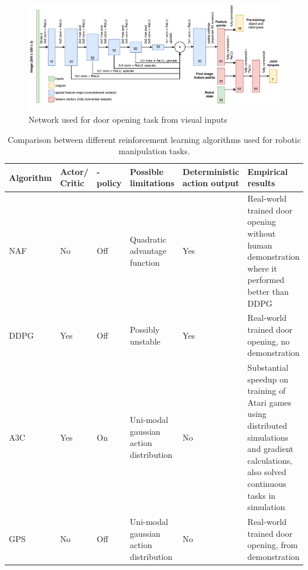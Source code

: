 \begin{figure}[h]
    \centering
    \includegraphics[width = 1.0\textwidth]{res/gps-net.pdf}
    \caption{Network used for door opening task from visual inputs \cite{chebotar2016path}}
    \label{fig:gps_net}
\end{figure}

\begin{landscape}
    \begin{table}
        \centering
        \begin{tabular}{|l|p{1.3cm}|l|p{4cm}|p{3cm}|p{6.5cm}|}
            \hline
            \textbf{Algorithm} & \textbf{Actor/ Critic} & \textbf{-policy} & \textbf{Possible limitations} & \textbf{Deterministic action output} & \textbf{Empirical results} \\
            \hline
            NAF \cite{gu2016continuous} & No & Off & Quadratic advantage function & Yes & Real-world trained door opening without human demonstration where it performed better than DDPG \\
            \hline
            DDPG \cite{lillicrap2015continuous} & Yes & Off & Possibly unstable & Yes & Real-world trained door opening, no demonstration \\
            \hline
            A3C \cite{mnih2016asynchronous} & Yes & On & Uni-modal gaussian action distribution & No & Substantial speedup on training of Atari games using distributed simulations and gradient calculations, also solved continuous tasks in simulation \\
            \hline
            GPS \cite{levine2013guided} & No & Off & Uni-modal gaussian action distribution & No & Real-world trained door opening, from demonstration \\
            \hline
        \end{tabular}

    \caption{Comparison between different reinforcement learning algorithms
    used for robotic manipulation tasks. }

    \end{table}
    \label{table:algo_comparison}

\end{landscape}

